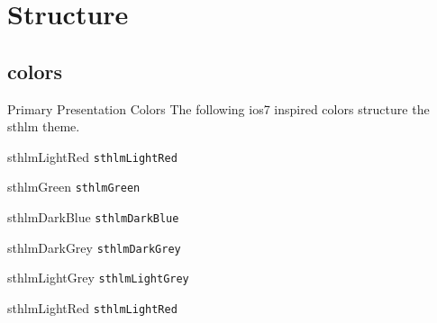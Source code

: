 \documentclass[compress]{beamer}
\begin{document}
\section{Structure}


\subsection{colors}


\begin{frame}{Primary Presentation Colors}
The following ios7 inspired colors structure the sthlm theme.

\begin{multicols}{2}
	
\begin{beamercolorbox}[wd=\linewidth,ht=2ex,dp=0.7ex]{sthlmLightRed}
	\texttt{sthlmLightRed}
\end{beamercolorbox}

\begin{beamercolorbox}[wd=\linewidth,ht=2ex,dp=0.7ex]{sthlmGreen}
	\texttt{sthlmGreen}
\end{beamercolorbox}

\begin{beamercolorbox}[wd=\linewidth,ht=2ex,dp=0.7ex]{sthlmDarkBlue}
	\texttt{sthlmDarkBlue}
\end{beamercolorbox}

\begin{beamercolorbox}[wd=\linewidth,ht=2ex,dp=0.7ex]{sthlmDarkGrey}
	\texttt{sthlmDarkGrey}
\end{beamercolorbox}

\begin{beamercolorbox}[wd=\linewidth,ht=2ex,dp=0.7ex]{sthlmLightGrey}
	\texttt{sthlmLightGrey}
\end{beamercolorbox}


\begin{beamercolorbox}[wd=\linewidth,ht=2ex,dp=0.7ex]{sthlmLightRed}
	\texttt{sthlmLightRed}
\end{beamercolorbox}


\end{multicols}
\end{frame}
\end{document}
